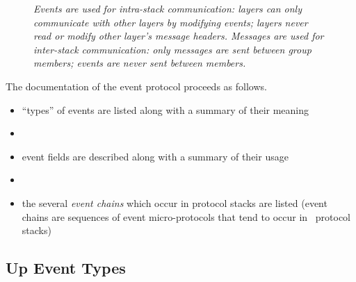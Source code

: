 \begin{figure}[tb]
\begin{center}
\end{center}
\caption{\em Events are used for intra-stack communication: layers can only
communicate with other layers by modifying events; layers never read or
modify other layer's message headers.  Messages are used for inter-stack
communication: only messages are sent between group members; events are
never sent between members.}
\label{comm:event}
\end{figure}

The documentation of the event protocol proceeds as follows.
\begin{itemize}
\item
``types'' of events are listed along with a summary of their meaning
\item
{}
\item
event fields are described along with a summary of their usage
\item
{}
\item
the several \emph{event chains} which occur in protocol stacks are listed
(event chains are sequences of event micro-protocols that tend to occur in
\ensemble\ protocol stacks)
\end{itemize}


\subsection{Up Event Types}

